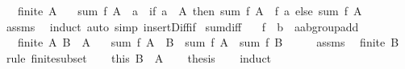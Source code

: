 \begin{isabellebody}
\ \ \ {\isachardoublequoteopen}finite\ A{\isachardoublequoteclose}\isanewline
\ \ \ {\isachardoublequoteopen}sum\ f\ {\isacharparenleft}{\kern0pt}A\ {\isacharminus}{\kern0pt}\ {\isacharbraceleft}{\kern0pt}a{\isacharbraceright}{\kern0pt}{\isacharparenright}{\kern0pt}\ {\isacharequal}{\kern0pt}\ {\isacharparenleft}{\kern0pt}if\ a\ {\isasymin}\ A\ then\ sum\ f\ A\ {\isacharminus}{\kern0pt}\ f\ a\ else\ sum\ f\ A{\isacharparenright}{\kern0pt}{\isachardoublequoteclose}\isanewline
%
\isadelimproof
\ \ %
\endisadelimproof
%
\isatagproof
{}\isamarkupfalse%
\ assms\ \isamarkupfalse%
\ induct\ {\isacharparenleft}{\kern0pt}auto\ simp{\isacharcolon}{\kern0pt}\ insert{\isacharunderscore}{\kern0pt}Diff{\isacharunderscore}{\kern0pt}if{\isacharparenright}{\kern0pt}%
\endisatagproof
{\isafoldproof}%
%
\isadelimproof
\isanewline
%
\endisadelimproof
\isanewline
{}\isamarkupfalse%
\ sum{\isacharunderscore}{\kern0pt}diff{\isacharcolon}{\kern0pt}\isanewline
\ \ \ f\ {\isacharcolon}{\kern0pt}{\isacharcolon}{\kern0pt}\ {\isachardoublequoteopen}{\isacharprime}{\kern0pt}b\ {\isasymRightarrow}\ {\isacharprime}{\kern0pt}a{\isacharcolon}{\kern0pt}{\isacharcolon}{\kern0pt}ab{\isacharunderscore}{\kern0pt}group{\isacharunderscore}{\kern0pt}add{\isachardoublequoteclose}\isanewline
\ \ \ {\isachardoublequoteopen}finite\ A{\isachardoublequoteclose}\ {\isachardoublequoteopen}B\ {\isasymsubseteq}\ A{\isachardoublequoteclose}\isanewline
\ \ \ {\isachardoublequoteopen}sum\ f\ {\isacharparenleft}{\kern0pt}A\ {\isacharminus}{\kern0pt}\ B{\isacharparenright}{\kern0pt}\ {\isacharequal}{\kern0pt}\ sum\ f\ A\ {\isacharminus}{\kern0pt}\ sum\ f\ B{\isachardoublequoteclose}\isanewline
%
\isadelimproof
%
\endisadelimproof
%
\isatagproof
{}\isamarkupfalse%
\ {\isacharminus}{\kern0pt}\isanewline
\ \ \isamarkupfalse%
\ assms{\isacharparenleft}{\kern0pt}{}{\isacharcomma}{\kern0pt}{}{\isacharparenright}{\kern0pt}\ \isamarkupfalse%
\ {\isachardoublequoteopen}finite\ B{\isachardoublequoteclose}\ \isamarkupfalse%
\ {\isacharparenleft}{\kern0pt}rule\ finite{\isacharunderscore}{\kern0pt}subset{\isacharparenright}{\kern0pt}\isanewline
\ \ \isamarkupfalse%
\ this\ {\isacartoucheopen}B\ {\isasymsubseteq}\ A{\isacartoucheclose}\isanewline
\ \ \isamarkupfalse%
\ {\isacharquery}{\kern0pt}thesis\isanewline
\ \ \isamarkupfalse%
\ induct\isanewline

\end{isabellebody}

